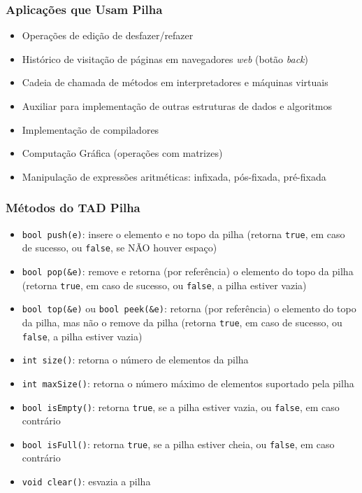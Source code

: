 \documentclass[aspectratio=169]{beamer}
\begin{document}
\begin{frame}\frametitle{Aplicações que Usam Pilha}
\begin{itemize}
	\item Operações de edição de desfazer/refazer
	\item Histórico de visitação de páginas em navegadores \emph{web} (botão \emph{back})
	\item Cadeia de chamada de métodos em interpretadores e máquinas virtuais
	\item Auxiliar para implementação de outras estruturas de dados e algoritmos
	\item Implementação de compiladores
	\item Computação Gráfica (operações com matrizes)
	\item Manipulação de expressões aritméticas: infixada, pós-fixada, pré-fixada %
\end{itemize}
\end{frame}

\begin{frame}\frametitle{Métodos do TAD Pilha}
\begin{itemize}
	\item \texttt{bool push(e)}: insere o elemento e no topo da pilha (retorna \texttt{true}, em caso de sucesso, ou \texttt{false}, se NÃO houver espaço)
	\item \texttt{bool pop(\&e)}: remove e retorna (por referência) o elemento do topo da pilha (retorna \texttt{true}, em caso de sucesso, ou \texttt{false}, a pilha estiver vazia)
	\item \texttt{bool top(\&e)} ou \texttt{bool peek(\&e)}: retorna (por referência) o elemento do topo da pilha, mas não o remove da pilha (retorna \texttt{true}, em caso de sucesso, ou \texttt{false}, a pilha estiver vazia)
	\item \texttt{int size()}: retorna o número de elementos da pilha
	\item \texttt{int maxSize()}: retorna o número máximo de elementos suportado pela pilha
	\item \texttt{bool isEmpty()}: retorna \texttt{true}, se a pilha estiver vazia, ou \texttt{false}, em caso contrário
	\item \texttt{bool isFull()}: retorna \texttt{true}, se a pilha estiver cheia, ou \texttt{false}, em caso contrário
	\item \texttt{void clear()}: esvazia a pilha
\end{itemize}
\end{frame}
\end{document}
